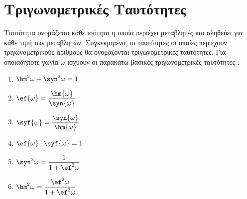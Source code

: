 \section{Τριγωνομετρικές Ταυτότητες}
\orismoi
{}
Ταυτότητα ονομάζεται κάθε ισότητα η οποία περιέχει μεταβλητές και αληθεύει για κάθε τιμή των μεταβλητών. Συγκεκριμένα, οι ταυτότητες οι οποίες περιέχουν τριγωνομετρικούς αριθμούς θα ονομάζονται τριγωνομετρικές ταυτότητες.
\thewrhmata
{}
Για οποιαδήποτε γωνία $ \omega $ ισχύουν οι παρακάτω βασικές τριγωνομετρικές ταυτότητες :
\begin{multicols}{3}
\begin{enumerate}[itemsep=0mm]
\item $ \hm^2{\omega}+\syn^2{\omega}=1 $
\item $ \ef{\omega}={\dfrac{\hm{\omega}}{\syn{\omega}}} $
\item $ \syf{\omega}={\dfrac{\syn{\omega}}{\hm{\omega}}} $
\item $ \ef{\omega}\cdot\syf{\omega}=1 $
\item $ \syn^2{\omega}=\dfrac{1}{1+\ef^2{\omega}} $
\item $ \hm^2{\omega}=\dfrac{\ef^2{\omega}}{1+\ef^2{\omega}} $
\end{enumerate}
\end{multicols}
